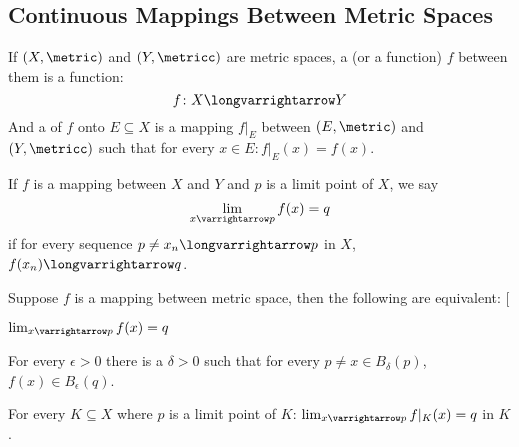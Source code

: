 \documentclass[10pt]{article}
\makeatletter
\def\@blist[#1]{%
    \bgroup\bgroup\par%
    \gdef\item{%
        \par\egroup\bgroup\medskip\setbox0=\hbox{#1\quad}%
        \advance\leftskip by \wd0\leavevmode\kern-\wd0\box0%
    }%
}
\def\blist{\@ifnextchar[ \@blist {\@blist[$\bullet$]}}
\def\elist{\par\egroup\egroup\medskip}
\makeatother
\begin{document}
\subsection{Continuous Mappings Between Metric Spaces}

\begin{defn*}

    If $(X,\metric)$ and $(Y,\metricc)$ are metric spaces, a  (or a function) $f$ between them is a function:
    \[ f\colon X\longvarrightarrow Y \]
    And a  of $f$ onto $E\subseteq X$ is a mapping $f\vert_E$ between $(E,\metric)$ and $(Y,\metricc)$ such that for every $x\in E: f\vert_E(x)=f(x)$.

\end{defn*}

\begin{defn*}

    If $f$ is a mapping between $X$ and $Y$ and $p$ is a limit point of $X$, we say
    \[ \lim_{x\varrightarrow p}f(x) = q \]
    if for every sequence $p\neq x_n\longvarrightarrow p$ in $X$, $f(x_n)\longvarrightarrow q$.

\end{defn*}

\begin{thrm*}

    Suppose $f$ is a mapping between metric space, then the following are equivalent:
    \blist
        \item $\lim_{x\varrightarrow p}f(x)=q$
        \item For every $\epsilon>0$ there is a $\delta>0$ such that for every $p\neq x\in B_\delta(p)$, $f(x)\in B_\epsilon(q)$.
        \item For every $K\subseteq X$ where $p$ is a limit point of $K$: $\lim_{x\varrightarrow p}f\vert_K(x)=q$ in $K$.
    \elist

\end{thrm*}
\end{document}
